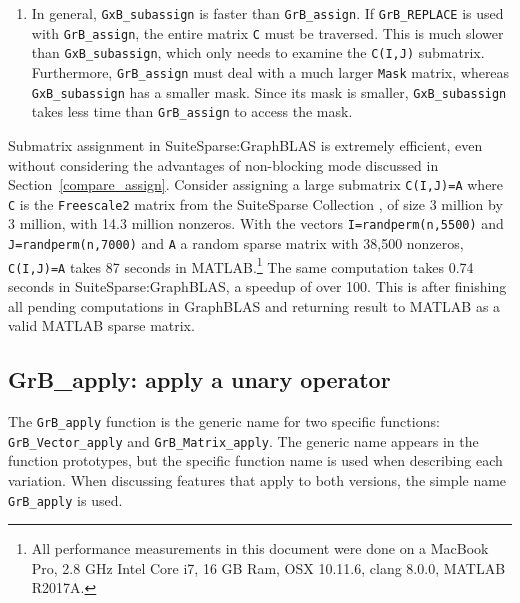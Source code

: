 \documentclass[12pt]{article}
\begin{document}
\begin{enumerate}
\item In general, \verb'GxB_subassign' is faster than \verb'GrB_assign'.
If \verb'GrB_REPLACE' is used with \verb'GrB_assign', the entire matrix
\verb'C' must be traversed.  This is much slower than \verb'GxB_subassign',
which only needs to examine the \verb'C(I,J)' submatrix.  Furthermore,
\verb'GrB_assign' must deal with a much larger \verb'Mask' matrix, whereas
\verb'GxB_subassign' has a smaller mask.  Since its mask is smaller,
\verb'GxB_subassign' takes less time than \verb'GrB_assign' to access the mask.

\end{enumerate}

Submatrix assignment in SuiteSparse:GraphBLAS is extremely efficient, even
without considering the advantages of non-blocking mode discussed in
Section~\ref{compare_assign}.  Consider assigning a large submatrix
\verb'C(I,J)=A' where \verb'C' is the \verb'Freescale2' matrix from the
SuiteSparse Collection \cite{DavisHu11}, of size 3 million by 3 million, with
14.3 million nonzeros.  With the vectors \verb'I=randperm(n,5500)' and
\verb'J=randperm(n,7000)' and \verb'A' a random sparse matrix with 38,500
nonzeros, \verb'C(I,J)=A' takes 87 seconds in MATLAB.\footnote{All performance
measurements in this document were done on a  MacBook Pro, 2.8 GHz Intel Core
i7, 16 GB Ram, OSX 10.11.6, clang 8.0.0, MATLAB R2017A.} The same computation
takes 0.74 seconds in SuiteSparse:GraphBLAS, a speedup of over 100.  This is
after finishing all pending computations in GraphBLAS and returning result to
MATLAB as a valid MATLAB sparse matrix. 

\newpage
\subsection{{\sf GrB\_apply:} apply a unary operator} %
\label{apply}

The \verb'GrB_apply' function is the generic name for two specific functions:
\\ \verb'GrB_Vector_apply' and  \verb'GrB_Matrix_apply'.  The generic name
appears in the function prototypes, but the specific function name is used when
describing each variation.  When discussing features that apply to both
versions, the simple name \verb'GrB_apply' is used.

\end{document}
